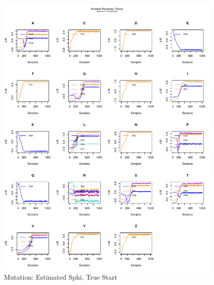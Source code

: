 \documentclass[11pt]{labbook}
\begin{document}
    \begin{figure}
        \centering
        \includegraphics[scale=.65]{FONSE_Plots/2016/November_9/estSphi_sim_mut}
        \caption{Mutation: Estimated Sphi, True Start}
        \label{fig:NOV9_E.S.MUT}
    \end{figure}
\end{document}
